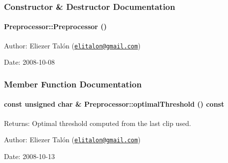 \subsubsection{Constructor \& Destructor Documentation}
\hypertarget{class_preprocessor_da966c8b83e7c3bcd8759549c3cdf688}{
\paragraph[Preprocessor]{\setlength{\rightskip}{0pt plus 5cm}Preprocessor::Preprocessor ()}\hfill}
\label{class_preprocessor_da966c8b83e7c3bcd8759549c3cdf688}


\begin{Desc}
\item[Author:]Eliezer Talón (\href{mailto:elitalon@gmail.com}{\tt elitalon@gmail.com}) \end{Desc}
\begin{Desc}
\item[Date:]2008-10-08 \end{Desc}


\subsubsection{Member Function Documentation}
\hypertarget{class_preprocessor_a44dff024a5b29752780bd4aa0d53d81}{
\paragraph[optimalThreshold]{\setlength{\rightskip}{0pt plus 5cm}const unsigned char \& Preprocessor::optimalThreshold () const}\hfill}
\label{class_preprocessor_a44dff024a5b29752780bd4aa0d53d81}


\begin{Desc}
\item[Returns:]Optimal threshold computed from the last clip used.\end{Desc}
\begin{Desc}
\item[Author:]Eliezer Talón (\href{mailto:elitalon@gmail.com}{\tt elitalon@gmail.com}) \end{Desc}
\begin{Desc}
\item[Date:]2008-10-13 \end{Desc}


